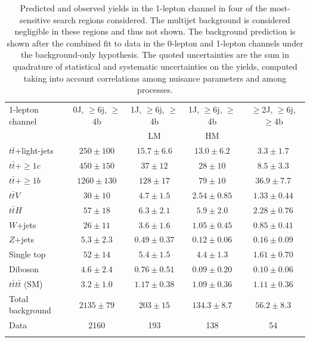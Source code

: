 \begin{table}[htb!]
\begin{center}
\begin{tabular}{l*{4}{c}}
\toprule\toprule
1-lepton channel & 0J, $\geq$6j, $\geq$4b & 1J, $\geq$6j, $\geq$4b & 1J, $\geq$6j, $\geq$4b & $\geq$2J, $\geq$6j, $\geq$4b  \\
& & LM & HM & \\
\midrule\midrule
$t\bar{t}$+light-jets & $ 250 \pm 100 $ &   $ 15.7 \pm 6.6 $ &   $ 13.0 \pm 6.2 $ &   $ 3.3 \pm 1.7 $ \\ 
$t\bar{t}$+$\geq$$1c$ & $ 450 \pm 150 $ &   $ 37 \pm 12 $ &   $ 28 \pm 10 $ &   $ 8.5 \pm 3.3 $ \\ 
$t\bar{t}$+$\geq$$1b$ & $ 1260 \pm 130$ &   $ 128 \pm 17 $ &   $ 79 \pm 10 $ &   $ 36.9 \pm 7.7 $ \\  
$t\bar{t}V$ & $ 30 \pm 10 $ &   $ 4.7 \pm 1.5 $ &   $ 2.54 \pm 0.85 $ &   $ 1.33 \pm 0.44 $ \\   
$t\bar{t}H$ & $ 57 \pm 18 $ &   $ 6.3 \pm 2.1 $ &   $ 5.9 \pm 2.0 $ &   $ 2.28 \pm 0.76 $ \\ 
$W$+jets & $ 26 \pm 11 $ &   $ 3.6 \pm 1.6 $ &   $ 1.05 \pm 0.45 $ &   $ 0.85 \pm 0.41 $ \\ 
$Z$+jets & $ 5.3 \pm 2.3 $ &   $ 0.49 \pm 0.37 $ &   $ 0.12 \pm 0.06 $ &   $ 0.16 \pm 0.09 $ \\ 
Single top & $ 52 \pm 14 $ &   $ 5.4 \pm 1.5 $ &   $ 4.4 \pm 1.3 $ &   $ 1.61 \pm 0.70 $ \\ 
Diboson & $ 4.6 \pm 2.4 $ &   $ 0.76 \pm 0.51 $ &   $ 0.09 \pm 0.20 $ &   $ 0.10 \pm 0.06 $ \\ 
$t\bar{t}t\bar{t}$ (SM) & $ 3.2 \pm 1.0 $ &   $ 1.17 \pm 0.38 $ &   $ 1.09 \pm 0.36 $ &   $ 1.11 \pm 0.36 $ \\ 
\midrule
Total background & $ 2135 \pm 79 $ &   $ 203 \pm 15 $ &   $ 134.3 \pm 8.7 $ &   $ 56.2 \pm 8.3 $ \\ 
\midrule
Data &  2160  & 193  & 138  & 54  \\ 
\bottomrule\bottomrule     \\
\end{tabular}
\vspace{0.1cm}

%
\end{center}
\vspace{-0.5cm}
\captionsetup{width=0.85\textwidth} \caption{\small Predicted and observed yields in the 1-lepton channel in four of the most-sensitive search regions considered. The multijet background is considered negligible in these regions and thus not shown. The background prediction is shown after the combined fit to data in the 0-lepton and 1-lepton channels under the background-only hypothesis. The quoted uncertainties are the sum in quadrature of statistical and systematic uncertainties on the yields, computed taking into account correlations among nuisance parameters and among processes. }
\label{chp:vlq:tab:Postfit_Yields_1L_unblind_COMB}
\end{table}
